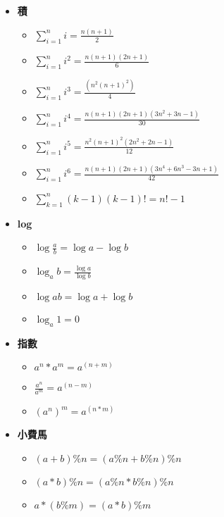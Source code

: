 \begin{itemize}
  \item \textbf{積}
  \begin{itemize}
    \item $\sum \limits_{i=1}^n i = \frac{n(n+1)}{2}$
    \item $\sum \limits_{i=1}^n i^2 = \frac{n(n+1)(2n+1)}{6}$
    \item $\sum \limits_{i=1}^n i^3 = \frac{(n^2(n+1)^2)}{4}$
    \item $\sum \limits_{i=1}^n i^4 = \frac{n(n+1)(2n+1)(3n^2+3n-1)}{30}$
    \item $\sum \limits_{i=1}^n i^5 = \frac{n^2(n+1)^2(2n^2+2n-1)}{12}$
    \item $\sum \limits_{i=1}^n i^6 = \frac{n(n+1)(2n+1)(3n^4+6n^3-3n+1)}{42}$
    \item $\sum \limits_{k=1}^n (k-1)(k-1)! = n!-1$
  \end{itemize}
  
  \item \textbf{log}
  \begin{itemize}
    \item $\log\frac{a}{b} = \log a - \log b$
    \item $\log_a b = \frac{\log a}{\log b}$
    \item $\log ab = \log a + \log b$
    \item $\log_a 1 = 0$
  \end{itemize}
  

  \item \textbf{指數}
  \begin{itemize}
    \item $a^n*a^m = a^(n+m)$
    \item $\frac{a^n}{a^m} = a^(n-m)$
    \item $(a^n)^m = a^(n*m)$
  \end{itemize}

  
  \item \textbf{小費馬}
  \begin{itemize}
    \item $(a+b)\%n = (a\%n+b\%n)\%n$
    \item $(a*b)\%n = (a\%n*b\%n)\%n$
    \item $a*(b\%m) = (a*b)\%m$
  \end{itemize}
\end{itemize}
